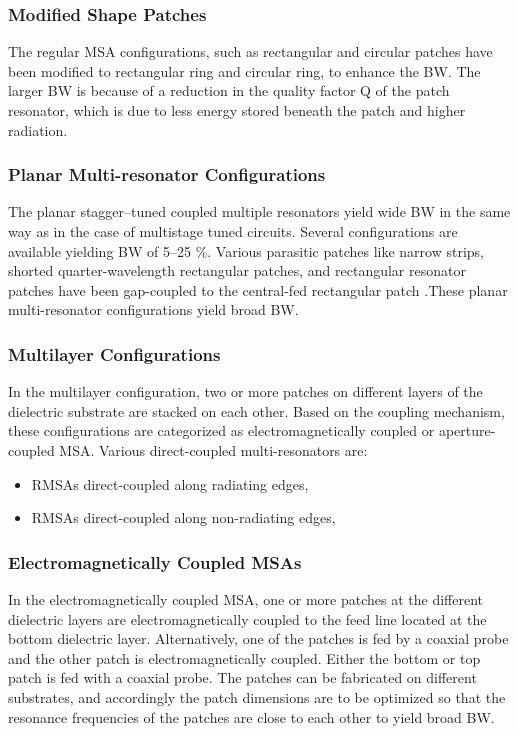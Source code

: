\documentclass[12pt]{article}
\begin{document}
			           \subsubsection{Modified Shape Patches}
			             \justify
			              The regular MSA configurations, such as rectangular and circular patches have been modified to rectangular ring and circular ring, to enhance the BW. The larger BW is because of a reduction in the quality factor Q of the patch resonator, which is due to less energy stored beneath the patch and higher radiation.\\
			            \subsubsection{ Planar Multi-resonator Configurations}
	 			            \justify
				             The planar stagger–tuned coupled multiple resonators yield wide BW in the same way as in the case of multistage tuned circuits. Several configurations are available yielding BW of 5–25 \%. Various parasitic patches like narrow strips, shorted quarter-wavelength rectangular patches, and rectangular resonator patches have been gap-coupled to the central-fed rectangular patch .These planar multi-resonator configurations yield broad BW.
				         \subsubsection{Multilayer Configurations}
				          \justify
				            In the multilayer configuration, two or more patches on different layers of the dielectric substrate are stacked on each other. Based on the coupling mechanism, these configurations are categorized as electromagnetically coupled or aperture-coupled MSA.
				            Various direct-coupled multi-resonators are:
				            \begin{itemize}
				            	\item    RMSAs direct-coupled along radiating edges,
				            	\item    RMSAs direct-coupled along non-radiating edges, 
				            \end{itemize}
				          \subsubsection{Electromagnetically Coupled MSAs}
				            \justify
				              In the electromagnetically coupled MSA, one or more patches at the different dielectric layers are electromagnetically coupled to the feed line located at the bottom dielectric layer.
				              Alternatively, one of the patches is fed by a coaxial probe and the other patch is electromagnetically coupled. Either the bottom or top patch is fed with a coaxial probe. The patches can be fabricated on different substrates, and accordingly the patch dimensions are to be optimized so that the resonance frequencies of the patches are close to each other to yield broad BW.
\end{document}
